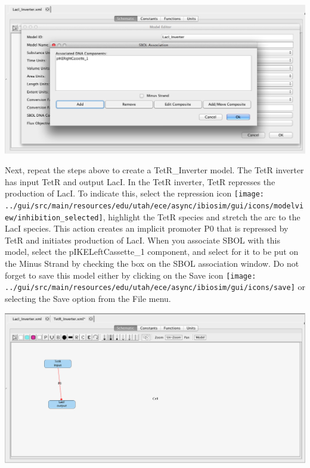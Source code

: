 \documentclass[titlepage,11pt]{article}
\begin{document}
\begin{center}
\includegraphics[width=160mm]{screenshots/SBOLAssociationGT}
\end{center}

Next, repeat the steps above to create a TetR\_Inverter model.  The TetR inverter has input TetR and output LacI.  In the TetR inverter, TetR represses the production of LacI.  To indicate this, select the repression icon \texttt{[image: ../gui/src/main/resources/edu/utah/ece/async/ibiosim/gui/icons/modelview/inhibition\_selected]}, highlight the TetR species and stretch the arc to the LacI species.  This action creates an implicit promoter P0 that is repressed by TetR and initiates production of LacI.  When you associate SBOL with this model, select the pIKELeftCassette\_1 component, and select for it to be put on the Minus Strand by checking the box on the SBOL association window.  Do not forget to save this model either by clicking on the Save icon \texttt{[image: ../gui/src/main/resources/edu/utah/ece/async/ibiosim/gui/icons/save]} or selecting the Save option from the File menu.

\begin{center}
\includegraphics[width=160mm]{screenshots/implicitPromoterGT}
\end{center}
\end{document}
